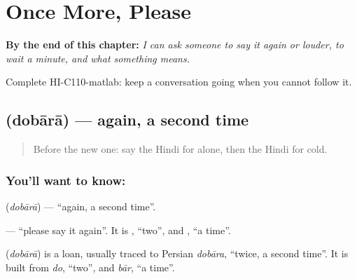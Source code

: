 
\chapter{Once More, Please}
\label{ch:hi-once-more-please}

\begin{chapteropening}
\textbf{By the end of this chapter:} \emph{I can ask someone to say it again or louder, to wait a minute, and what something means.}

Complete HI-C110-matlab: keep a conversation going when you cannot follow it.
\end{chapteropening}

\section[\texorpdfstring{\hi{दोबारा} (dobārā)}{दोबारा (dobārā)}]{ (dobārā) — again, a second time}

\label{lesson:HI-C110-dobara}



\begin{quote}
Before the new one: say the Hindi for alone, then the Hindi for cold.
\end{quote}

\subsection*{You'll want to know: }
\textbf{} (\emph{dobārā}) — \textquotedblleft{}again, a second time\textquotedblright{}.

\textbf{ } — \textquotedblleft{}please say it again\textquotedblright{}. It is \textbf{}, \textquotedblleft{}two\textquotedblright{}, and \textbf{}, \textquotedblleft{}a time\textquotedblright{}.

\begin{cousinweb}
\textbf{} (\emph{dobārā}) is a loan, usually traced to Persian \emph{dobāra}, \textquotedblleft{}twice, a second time\textquotedblright{}. It is built from \emph{do}, \textquotedblleft{}two\textquotedblright{}, and \emph{bār}, \textquotedblleft{}a time\textquotedblright{}.
\end{cousinweb}

